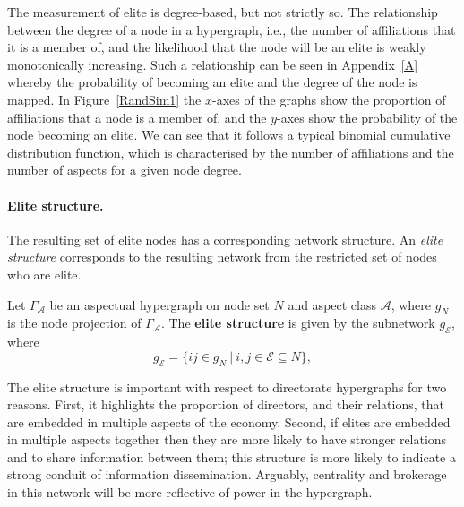The measurement of elite is degree-based, but not strictly so. The relationship between the degree of a node in a hypergraph, i.e., the number of affiliations that it is a member of, and the likelihood that the node will be an elite is weakly monotonically increasing. Such a relationship can be seen in Appendix~\ref{A} whereby the probability of becoming an elite and the degree of the node is mapped. In Figure~\ref{RandSim1} the $x$-axes of the graphs show the proportion of affiliations that a node is a member of, and the $y$-axes show the probability of the node becoming an elite. We can see that it follows a typical binomial cumulative distribution function, which is characterised by the number of affiliations and the number of aspects for a given node degree.

\paragraph{Elite structure.}

The resulting set of elite nodes has a corresponding network structure. An \emph{elite structure} corresponds to the resulting network from the restricted set of nodes who are elite.

\begin{definition}
Let $\Gamma_{\mathcal{A}}$ be an aspectual hypergraph on node set $N$ and aspect class $\mathcal{A}$, where $g_{N}$ is the node projection of $\Gamma_{\mathcal{A}}$. The \textbf{elite structure} is given by the subnetwork $g_{\mathcal{E}}$, where
\begin{equation}
g_{\mathcal{E}} = \{ ij \in g_{N} ~ | ~ i,j \in \mathcal{E} \subseteq N \},
\end{equation}
\end{definition}

The elite structure is important with respect to directorate hypergraphs for two reasons. First, it highlights the proportion of directors, and their relations, that are embedded in multiple aspects of the economy. Second, if elites are embedded in multiple aspects together then they are more likely to have stronger relations and to share information between them; this structure is more likely to indicate a strong conduit of information dissemination. Arguably, centrality and brokerage in this network will be more reflective of power in the hypergraph.

